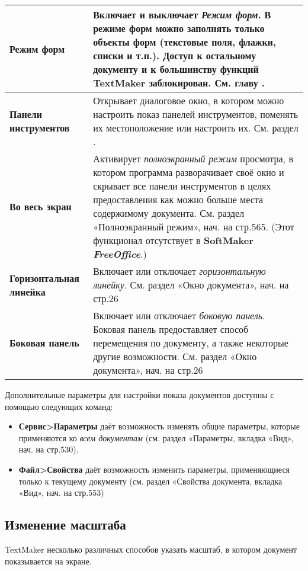 ﻿\documentclass[a4paper,10pt]{article}
\begin{document}
\begin{longtable}{  m{4cm}  m{12cm}  }
  \hline
  \textbf{Режим форм} & Включает и выключает \textit{Режим форм}. В режиме форм можно заполнять только объекты форм (текстовые поля, флажки, списки и т.п.). Доступ к остальному документу и к большинству функций TextMaker заблокирован. См. главу \nameref{sec:формы}.\\
  \hline
  \textbf{Панели инструментов} & Открывает диалоговое окно, в котором можно настроить показ панелей инструментов, поменять их местоположение или настроить их. См. раздел \nameref{sec:настрпанинстр}.\\
  \hline
  \textbf{Во весь экран} & Активирует \textit{полноэкранный режим} просмотра, в котором программа разворачивает своё окно и скрывает все панели инструментов в целях предоставления как можно больше места содержимому документа. См. раздел «Полноэкранный режим», нач. на стр.565. (Этот функционал отсутствует в \textbf{SoftMaker \textit{FreeOffice}}.)\\
  \hline
  \textbf{Горизонтальная линейка} & Включает или отключает \textit{горизонтальную линейку}. См. раздел «Окно документа», нач. на стр.26\\
  \hline
  \textbf{Боковая панель} & Включает или отключает \textit{боковую панель}. Боковая панель предоставляет способ перемещения по документу, а также некоторые другие возможности. См. раздел «Окно документа», нач. на стр.26\\
 \end{longtable} 
 
 Дополнительные параметры для настройки показа документов доступны с помощью следующих команд:
 \begin{itemize}
  \item \textbf{Сервис>Параметры} даёт возможность изменять общие параметры, которые применяются ко \textit{всем документам} (см. раздел «Параметры, вкладка «Вид», нач. на стр.530).
  \item \textbf{Файл>Свойства} даёт возможность изменить параметры, применяющиеся только к текущему документу (см. раздел «Свойства документа, вкладка «Вид», нач. на стр.553)
 \end{itemize}
 
 \subsection{Изменение масштаба}
 TextMaker несколько различных способов указать масштаб, в котором документ показывается на экране.
 
\end{document}
